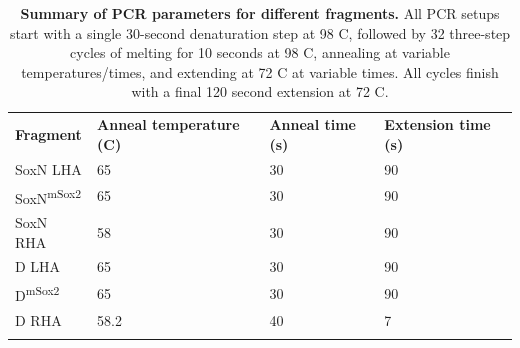 \documentclass[withindex,glossary]{cam-thesis}
\begin{document}
\begin{table}[htbp]
\centering
\begin{adjustbox}{width=\textwidth, center=\textwidth}
\begin{tabular}{llll}
\rowcolor{thead}
{\color{headtext} \textbf{Fragment}} & {\color{headtext} \textbf{Anneal temperature (\textdegree{}C)}} & {\color{headtext} \textbf{Anneal time (s)}} & {\color{headtext} \textbf{Extension time (s)}} \\
SoxN LHA          & 65                                                                         & 30                                                                 & 90                                                                    \\
SoxN\textsuperscript{mSox2}         & 65                                                                         & 30                                                                 & 90                                                                    \\
SoxN RHA          & 58                                                                         & 30                                                                 & 90                                                                    \\
D LHA             & 65                                                                         & 30                                                                 & 90                                                                    \\
D\textsuperscript{mSox2}            & 65                                                                         & 30                                                                 & 90                                                                    \\
D RHA             & 58.2                                                                       & 40                                                                 & 7      \\ \bottomrule{}                                                              
\end{tabular}
\end{adjustbox}
\caption{\textbf{Summary of PCR parameters for different fragments.} All PCR setups start with a single 30-second denaturation step at 98 \textdegree{}C, followed by 32 three-step cycles of melting for 10 seconds at 98 \textdegree{}C, annealing at variable temperatures/times, and extending at 72 \textdegree{}C at variable times. All cycles finish with a final 120 second extension at 72 \textdegree{}C.}
\end{table}
\end{document}
